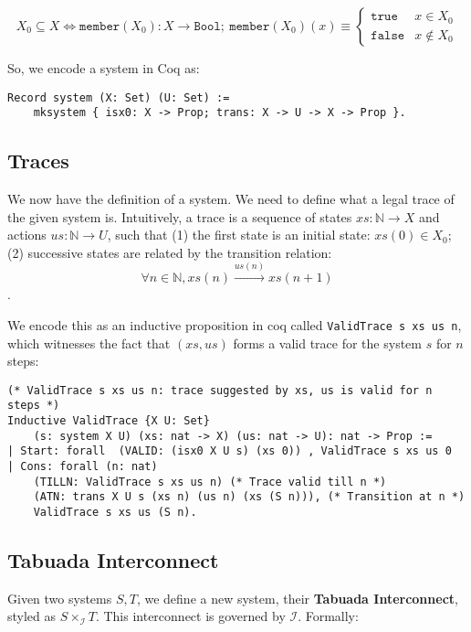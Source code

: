\documentclass{article}
\newcommand{\N}{\mathbb{N}}
\begin{document}
$$
X_0 \subseteq X \iff \texttt{member}(X_0): X \rightarrow \texttt{Bool}; ~ 
\texttt{member}(X_0)(x) \equiv 
\begin{cases}
    \texttt{true} & x \in X_0 \\
    \texttt{false} & x \not \in X_0
\end{cases}
$$

So, we encode a system in Coq as:
\begin{verbatim}
Record system (X: Set) (U: Set) := 
    mksystem { isx0: X -> Prop; trans: X -> U -> X -> Prop }.
\end{verbatim}

\subsection{Traces}

We now have the definition of a system. We need to define what a legal
trace of the given system is. Intuitively, a trace is a sequence of
states $xs : \N \rightarrow X$ and actions $us: \N \rightarrow U$,
such that (1) the first state is an initial state: $xs(0) \in X_0$; 
(2) successive states are related by the transition relation:
{$$\forall n \in \N, xs(n) \xrightarrow{us(n)} xs(n+1)$$}.

We encode this as an inductive proposition in coq called \texttt{ValidTrace s xs us n},
which witnesses the fact that $(xs, us)$ forms a valid trace for the system $s$
for $n$ steps:

\begin{verbatim}
(* ValidTrace s xs us n: trace suggested by xs, us is valid for n steps *)
Inductive ValidTrace {X U: Set}
    (s: system X U) (xs: nat -> X) (us: nat -> U): nat -> Prop :=
| Start: forall  (VALID: (isx0 X U s) (xs 0)) , ValidTrace s xs us 0
| Cons: forall (n: nat)
    (TILLN: ValidTrace s xs us n) (* Trace valid till n *)
    (ATN: trans X U s (xs n) (us n) (xs (S n))), (* Transition at n *)
    ValidTrace s xs us (S n).
\end{verbatim}

\subsection{Tabuada Interconnect}

Given two systems $S, T$, we define a new system, their \textbf{Tabuada Interconnect},
styled as $S \times_{\mathcal I} T$. This interconnect is governed by $\mathcal I$.
Formally:
\end{document}
